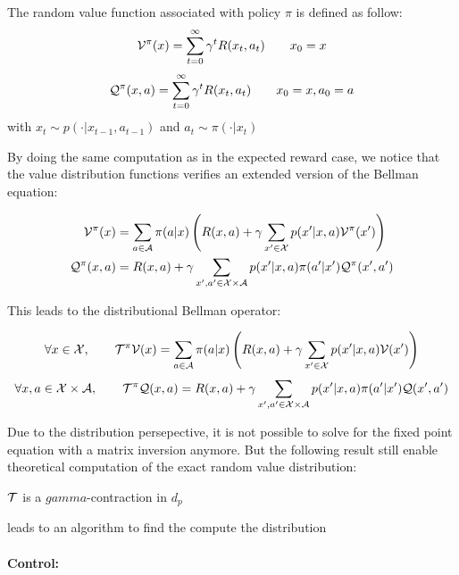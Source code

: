 \begin{definition}
The random value function associated with policy $\pi$ is defined as follow:
\[ \mathcal{V}^\pi(x) = \sum_{t=0}^\infty  \gamma^t R(x_t, a_t) \qquad x_0 = x \]
\[ \mathcal{Q}^\pi(x,a) = \sum_{t=0}^\infty  \gamma^t R(x_t, a_t) \qquad x_0 = x, a_0 = a \] 
with $x_t \sim p(\cdot | x_{t-1}, a_{t-1})$ and $a_t \sim \pi(\cdot | x_t)$
\end{definition}

By doing the same computation as in the expected reward case, we notice that the value distribution functions verifies an extended version of the Bellman equation:

\begin{align}
\mathcal{V}^\pi(x) & = \sum_{a \in \mathcal{A}} \pi(a|x) \left( R(x,a) + \gamma \sum_{x^\prime  \in \mathcal{X}} p(x^\prime |x,a)\mathcal{V}^\pi(x^\prime ) \right) \\
\mathcal{Q}^\pi(x,a) & = R(x,a) + \gamma \sum_{x^\prime ,a^\prime  \in \mathcal{X} \times \mathcal{A}} p(x^\prime |x,a)\pi(a^\prime |x^\prime )\mathcal{Q}^\pi(x^\prime ,a^\prime )
\end{align}

This leads to the distributional Bellman operator:

\begin{definition}
\[ \forall x \in \mathcal{X}, \qquad \mathcal{T}^\pi \mathcal{V}(x) = \sum_{a \in \mathcal{A}} \pi(a|x) \left( R(x,a) + \gamma \sum_{x^\prime  \in \mathcal{X}} p(x^\prime |x,a)\mathcal{V}(x^\prime ) \right) \]
\[ \forall x,a \in \mathcal{X} \times \mathcal{A}, \qquad \mathcal{T}^\pi \mathcal{Q}(x,a) = R(x,a) + \gamma \sum_{x^\prime ,a^\prime  \in \mathcal{X} \times \mathcal{A}} p(x^\prime |x,a)\pi(a^\prime |x^\prime )\mathcal{Q}(x^\prime ,a^\prime ) \]
\end{definition}

Due to the distribution persepective, it is not possible to solve for the fixed point equation with a matrix inversion anymore. But the following result still enable theoretical computation of the exact random value distribution:

\begin{lemma}
    $\mathcal{T}$ is a $gamma$-contraction in $d_p$
\end{lemma}

leads to an algorithm to find the compute the distribution

\paragraph{Control:}

